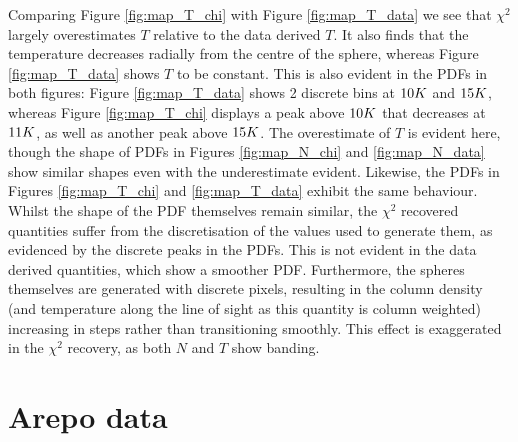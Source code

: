 \documentclass{report}
\begin{document}
Comparing Figure \ref{fig:map_T_chi} with Figure \ref{fig:map_T_data} we see that $\chi^{2}$ largely overestimates $T$ relative to the data derived $T$. It also finds that the temperature decreases radially from the centre of the sphere, whereas Figure \ref{fig:map_T_data} shows $T$ to be constant. This is also evident in the PDFs in both figures: Figure \ref{fig:map_T_data} shows 2 discrete bins at $10\/K$ and
$15\/K$, whereas Figure \ref{fig:map_T_chi} displays a peak above $10\/K$ that decreases at $11\/K$, as well as another peak above $15\/K$. The overestimate of $T$ is evident here, though the shape of PDFs in Figures \ref{fig:map_N_chi} and \ref{fig:map_N_data} show similar shapes even with the underestimate evident. Likewise, the PDFs in Figures
\ref{fig:map_T_chi} and \ref{fig:map_T_data} exhibit the same behaviour. Whilst the shape of the PDF themselves remain similar, the $\chi^{2}$ recovered quantities suffer from the discretisation of the values used to generate them, as evidenced by the discrete peaks in the PDFs. This is not evident in the data derived quantities, which show a smoother PDF. Furthermore, the spheres themselves are generated with discrete pixels, resulting in the column density (and temperature along the line of sight as this quantity is column weighted) increasing in steps rather than transitioning smoothly. This effect is exaggerated in the $\chi^{2}$ recovery, as both $N$ and $T$ show banding.


\pagebreak
\section{Arepo data} \label{sec:sph}
\end{document}
